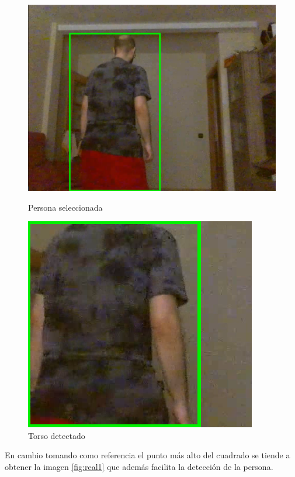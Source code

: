 \begin{figure}[!htb]
    \includegraphics[width=\linewidth]{figures/real/cap1.png}
    \caption{Persona seleccionada}\label{fig:real1}
\endminipage\hfill
{}
    \includegraphics[width=\linewidth]{figures/real/cap2.png}
    \caption{Torso detectado}\label{fig:real2}
\endminipage\hfill
\end{figure}

En cambio tomando como referencia el punto más alto del cuadrado se tiende a obtener la imagen \ref{fig:real1} que además facilita la detección de la persona.
